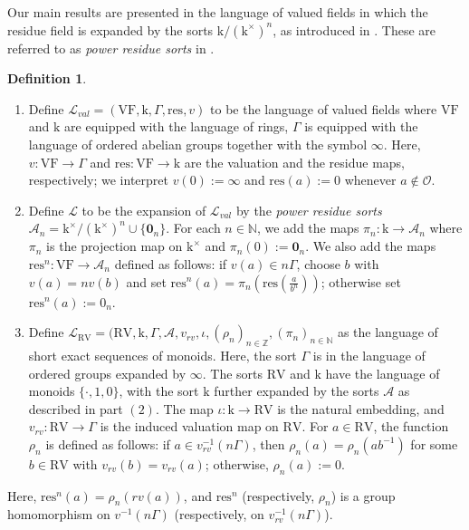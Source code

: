 \documentclass[12pt]{article}
\newcommand{\res}{\mathrm{res}}
\newcommand{\rv}{\mathrm{RV}}
\newcommand{\val}{\textit{v}}
\newcommand{\0}{\emptyset}
\newcommand{\vf}{\mathrm{VF}}
\newcommand{\vg}{\Gamma}
\newcommand{\rf}{\mathrm{k}}
\newcommand{\A}{\mathcal{A}}
\theoremstyle{plain}%
\theoremstyle{definition}
\newtheorem{defn}[thm]{Definition}
\theoremstyle{remark}
\begin{document}
Our main results are presented in the language of valued fields in which the residue field is expanded by the sorts $\rf/(\rf^{\times})^{n}$, as introduced in \cite{ACG22}. These are referred to as \emph{power residue sorts} in \cite{Vic22}.
\begin{defn}\label{language} \begin{enumerate}
\item Define $\mathcal{L}_{val}= (\vf, \rf,\vg, \res,\val)$ to be the language of valued fields where $\vf$ and $\rf$ are equipped with the language of rings, $\Gamma$ is equipped with the language of ordered abelian groups together with the symbol $\infty$. Here, $\val: \vf \to \vg$ and $\res: \vf\to \rf $ are the valuation and the residue maps, respectively; we interpret $\val(0):=\infty$ and $\res(a):=0$ whenever $a\not\in\mathcal{O}$.

\item Define $\mathcal{L}$ to be the expansion of $\mathcal{L}_{val}$ by the \textit{power residue sorts} $\mathcal{A}_n= \rf^{\times}/(\rf^{\times})^n \cup\{ \textbf{0}_n \}$. For each $n\in \mathbb{N}$, we add the maps $\pi_n: \rf \to \mathcal{A}_n $ where $\pi_n$ is the projection map on $\rf^{\times}$ and $\pi_n(0):=\textbf{0}_n$. We also add the maps  $\res^n: \vf \to \mathcal{A}_n$ defined as follows: if $\val(a)\in n\Gamma$, choose $b$ with $\val(a)=n\val(b)$ and set $\res^n(a) = \pi_n(\res(\frac{a}{b^n}))$; otherwise set $\res^n(a):=0_n$.

\item Define $\mathcal{L}_{\rv} = (\rv, \rf,\vg, \A, \val_{rv}, \iota, (\rho_n)_{n \in \mathbb{Z}}, (\pi_n)_{n \in \mathbb{N}}$ as the language of short exact sequences of monoids. Here, the sort $\Gamma$ is in the language of ordered groups expanded by $\infty$. The sorts $\rv$ and $\rf$ have the language of monoids $\{\cdot, 1, 0\}$, with the sort $\rf$ further expanded by the sorts $\A$ as described in part $(2)$.  The map $\iota : \rf \to \rv$ is the natural embedding, and $\val_{rv} : \rv \to \Gamma$ is the induced valuation map on $\rv$. For $a \in \rv$, the function $\rho_n$ is defined as follows: if $a \in \val_{rv}^{-1}(n\Gamma)$, then $\rho_n(a) = \rho_n(ab^{-1})$ for some $b \in \rv$ with $\val_{rv}(b) = \val_{rv}(a)$; otherwise, $\rho_n(a) := 0$.

\end{enumerate}

\end{defn}
Here, $\res^n(a)=\rho_n(rv(a))$, and $\res^n$ (respectively, $\rho_n$) is a group homomorphism on $\val^{-1}(n\Gamma)$ (respectively, on $\val_{rv}^{-1}(n\Gamma)$). 
\end{document}
